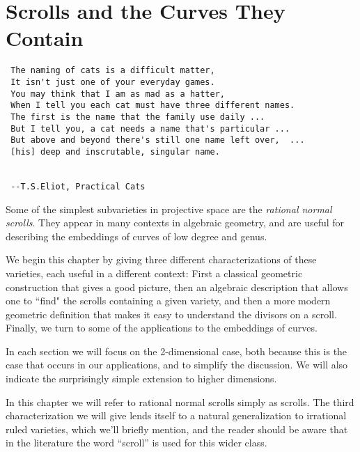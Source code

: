 

\chapter{Scrolls and the Curves They Contain}
\label{ScrollsChapter}

\begin{verbatim}
 The naming of cats is a difficult matter,
 It isn't just one of your everyday games.
 You may think that I am as mad as a hatter,
 When I tell you each cat must have three different names.
 The first is the name that the family use daily ...
 But I tell you, a cat needs a name that's particular ...
 But above and beyond there's still one name left over,  ...
 [his] deep and inscrutable, singular name.

 
 --T.S.Eliot, Practical Cats
\end{verbatim}


Some of the simplest subvarieties in projective space are the \emph{rational normal scrolls}. They appear in many contexts in algebraic geometry, and are useful for describing the embeddings of curves of low degree and genus. 

We begin this chapter by giving three different characterizations of these varieties, each useful in a different context: First a classical geometric construction that gives a good picture, then an algebraic description that allows one to ``find" the scrolls containing a given variety, and then a more modern geometric definition that makes it easy to understand the divisors on a scroll. Finally, we turn to some of the applications to the embeddings of curves.

In each section we will focus on the 2-dimensional case, both because this is the case that occurs in our applications, and to simplify the discussion. We will also indicate the surprisingly simple extension to higher dimensions.

In this chapter we will refer to rational normal scrolls simply as scrolls. The third characterization we will give lends itself to a natural generalization to  irrational ruled varieties, which we'll briefly mention, and the reader should be aware that in the literature the word ``scroll'' is used for this wider class.


